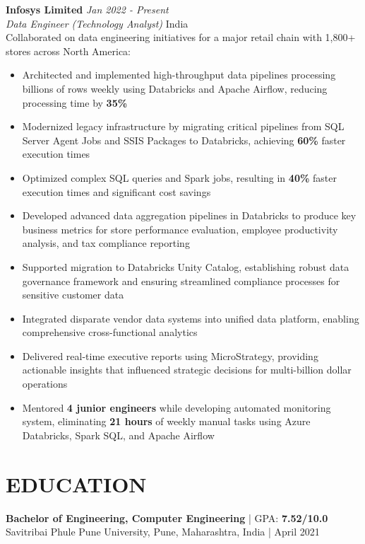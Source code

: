 \documentclass[10pt,letterpaper]{article}
\newcommand{\jobentry}[4]{
    \noindent\textbf{#1} \hfill \textit{#2} \\
    \textit{#3} \hfill #4 \\[4pt]
}
\newcommand{\metric}[1]{\textbf{\color{accent}#1}}
\begin{document}
\jobentry{Infosys Limited}{Jan 2022 - Present}{Data Engineer (Technology Analyst)}{India}
\noindent Collaborated on data engineering initiatives for a major retail chain with 1,800+ stores across North America:

\begin{itemize}[leftmargin=*,nosep,itemsep=3pt,topsep=4pt]
    \item Architected and implemented high-throughput data pipelines processing billions of rows weekly using Databricks and Apache Airflow, reducing processing time by \metric{35\%}
    
    \item Modernized legacy infrastructure by migrating critical pipelines from SQL Server Agent Jobs and SSIS Packages to Databricks, achieving \metric{60\%} faster execution times
    
    \item Optimized complex SQL queries and Spark jobs, resulting in \metric{40\%} faster execution times and significant cost savings
    
    \item Developed advanced data aggregation pipelines in Databricks to produce key business metrics for store performance evaluation, employee productivity analysis, and tax compliance reporting
    
    \item Supported migration to Databricks Unity Catalog, establishing robust data governance framework and ensuring streamlined compliance processes for sensitive customer data
    
    \item Integrated disparate vendor data systems into unified data platform, enabling comprehensive cross-functional analytics
    
    \item Delivered real-time executive reports using MicroStrategy, providing actionable insights that influenced strategic decisions for multi-billion dollar operations
    
    \item Mentored \textbf{4 junior engineers} while developing automated monitoring system, eliminating \metric{21 hours} of weekly manual tasks using Azure Databricks, Spark SQL, and Apache Airflow
\end{itemize}

\section{EDUCATION}
\noindent\textbf{Bachelor of Engineering, Computer Engineering} | GPA: \textbf{7.52/10.0} \\
Savitribai Phule Pune University, Pune, Maharashtra, India | April 2021
\end{document}

